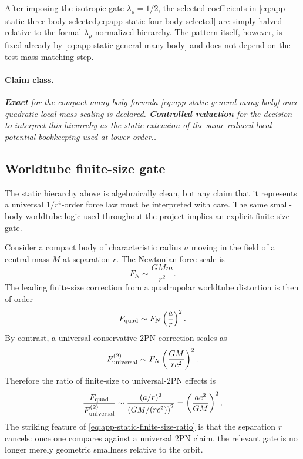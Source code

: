\documentclass[11pt]{article}
\newcommand{\TwoPN}{\mathrm{2PN}}
\newcommand{\Exact}{\textbf{Exact}}
\newcommand{\Controlled}{\textbf{Controlled reduction}}
\newcommand{\claimclass}[1]{\paragraph{Claim class.}\emph{#1.}}
\begin{document}
After imposing the isotropic gate \(\lambda_\rho=1/2\), the selected coefficients in
\cref{eq:app-static-three-body-selected,eq:app-static-four-body-selected} are simply
halved relative to the formal \(\lambda_\rho\)-normalized hierarchy.  The pattern itself,
however, is fixed already by \cref{eq:app-static-general-many-body} and does not depend on
the test-mass matching step.

\claimclass{\Exact{} for the compact many-body formula
\cref{eq:app-static-general-many-body} once quadratic local mass scaling is declared.
\Controlled{} for the decision to interpret this hierarchy as the static extension of the
same reduced local-potential bookkeeping used at lower order.}

\subsection{Worldtube finite-size gate}
\label{app:static-finite-size}

The static hierarchy above is algebraically clean, but any claim that it represents a
universal \(1/r^4\)-order force law must be interpreted with care.  The same small-body
worldtube logic used throughout the project implies an explicit finite-size gate.

Consider a compact body of characteristic radius \(a\) moving in the field of a central
mass \(M\) at separation \(r\).  The Newtonian force scale is
\begin{equation}
F_N\sim \frac{GMm}{r^2}.
\label{eq:app-static-FN}
\end{equation}
The leading finite-size correction from a quadrupolar worldtube distortion is then of
order
\begin{equation}
F_{\rm quad}\sim F_N\left(\frac{a}{r}\right)^2.
\label{eq:app-static-Fquad}
\end{equation}
By contrast, a universal conservative \(\TwoPN\) correction scales as
\begin{equation}
F_{\rm universal}^{(2)}\sim F_N\left(\frac{GM}{rc^2}\right)^2.
\label{eq:app-static-F2PN}
\end{equation}
Therefore the ratio of finite-size to universal-\(\TwoPN\) effects is
\begin{equation}
\frac{F_{\rm quad}}{F_{\rm universal}^{(2)}}
\sim
\frac{(a/r)^2}{\left(GM/(rc^2)\right)^2}
=
\left(\frac{ac^2}{GM}\right)^2.
\label{eq:app-static-finite-size-ratio}
\end{equation}
The striking feature of \cref{eq:app-static-finite-size-ratio} is that the separation
\(r\) cancels: once one compares against a universal \(\TwoPN\) claim, the relevant gate
is no longer merely geometric smallness relative to the orbit.
\end{document}
